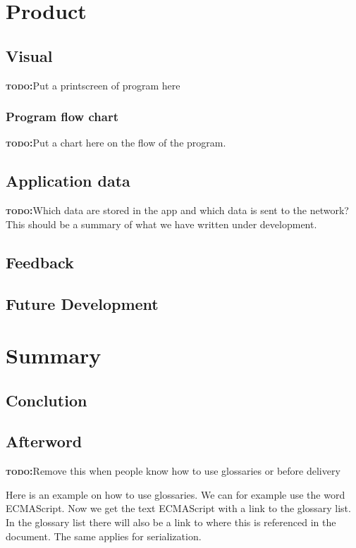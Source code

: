 \documentclass[BSP,english,oneside]{classes/gucthesis}
\newcommand{\todo}[1]{{\par\noindent\textbf{\textsc{\color{Gray}todo:}}\color{green}#1}}
\begin{document}
\part{Product}

	\chapter{Visual}
		\todo{Put a printscreen of program here}

		\section{Program flow chart}
			\todo{Put a chart here on the flow of the program.}

	\chapter{Application data}
		\todo{Which data are stored in the app and which data is sent to the
				network? This should be a summary of what we have written under
				development.}

	\chapter{Feedback}
		

	\chapter{Future Development}



\part{Summary}

	\chapter{Conclution}
		

	\chapter{Afterword}
		\label{chap:afterword}
		


\todo{Remove this when people know how to use glossaries or before delivery}
Here is an example on how to use glossaries. We can for example use the word
\gls{ECMAScript}. Now we get the text ECMAScript with a link to the glossary
list. In the glossary list there will also be a link to where this is 
referenced in the document. The same applies for \gls{serialization}.
\end{document}
